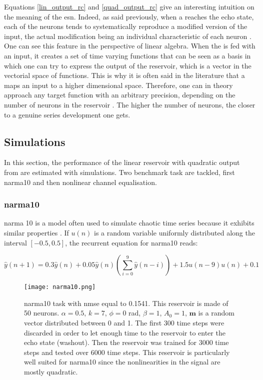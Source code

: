  Equations \eqref{lin_output_rc} and \eqref{quad_output_rc} give an interesting intuition on the meaning of the \gls{esn}. Indeed, as said previously, when a \rc reaches the echo state, each of the neurons tends to systematically reproduce a modified version of the input, the actual modification being an individual characteristic of each neuron \cite{Jaeger2004}. One can see this feature in the perspective of linear algebra. When the \rcer is fed with an input, it creates a set of time varying functions that can be seen as a basis in which one can try to express the output of the reservoir, which is a vector in the vectorial space of functions. This is why it is often said in the literature that a \rcer maps an input to a higher dimensional space. Therefore, one can in theory approach any target function with an arbitrary precision, depending on the number of neurons in the reservoir \cite{Jaeger2004}. The higher the number of neurons, the closer to a genuine series development one gets.\\


\subsection{Simulations}

In this section, the performance of the linear reservoir with quadratic output from \cite{Vinckier2015} are estimated with simulations. Two benchmark task are tackled, first \acrshort{narma}10 and then nonlinear channel equalisation.


\subsubsection{\acrshort{narma}10}

\gls{narma}  10 is a model often used to simulate chaotic time series because it exhibits similar properties \cite{Paquot2012}. If $u(n)$ is a random variable uniformly distributed along the interval $[-0.5, 0.5]$, the recurrent equation for \gls{narma}10 reads:

\begin{equation}
	\hat{y}(n+1) = 0.3\hat{y}(n)+0.05\hat{y}(n)\left(\sum_{i=0}^9 \hat{y}(n-i) \right)+1.5u(n-9)u(n)+0.1
\end{equation}

\begin{figure}[h]
	\centering
	\texttt{[image: narma10.png]}
	\caption{\gls{narma}10 task with \gls{nmse} equal to 0.1541. This reservoir is made of 50 neurons. $\alpha=0.5$, $k=7$, $\phi=0$ rad, $\beta=1$, $A_0=1$, $\mathbf{m}$ is a random vector distributed between 0 and 1. The first 300 time steps were discarded in order to let enough time to the reservoir to enter the echo state (washout). Then the reservoir was trained for 3000 time steps and tested over 6000 time steps. This reservoir is particularly well suited for  \gls{narma}10 since the nonlinearities in the signal are mostly quadratic.}
	\label{narma10}
\end{figure}

